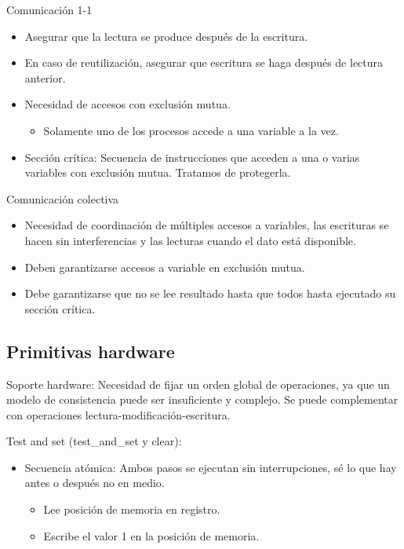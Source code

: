 \documentclass[12pt, twoside, openright]{report} %
\begin{document}
Comunicación 1-1

\begin{itemize}

	\item Asegurar que la lectura se produce después de la escritura.
	\item En caso de reutilización, asegurar que escritura se haga después
	      de lectura anterior.
	\item Necesidad de accesos con exclusión mutua.

	      \begin{itemize}

		      \item Solamente uno de los procesos accede a una variable a la vez.
	      \end{itemize}
	\item Sección crítica: Secuencia de instrucciones que acceden a una o
	      varias variables con exclusión mutua. Tratamos de protegerla.
\end{itemize}

Comunicación colectiva

\begin{itemize}

	\item Necesidad de coordinación de múltiples accesos a variables, las
	      escrituras se hacen sin interferencias y las lecturas cuando el
	      dato está disponible.
	\item Deben garantizarse accesos a variable en exclusión mutua.
	\item Debe garantizarse que no se lee resultado hasta que todos hasta
	      ejecutado su sección crítica.
\end{itemize}

\subsection{Primitivas hardware}



Soporte hardware: Necesidad de fijar un orden global de
operaciones, ya que un modelo de consistencia puede ser
insuficiente y complejo. Se puede complementar con operaciones
lectura-modificación-escritura.

Test and set (test\_and\_set y clear):

\begin{itemize}

	\item Secuencia atómica: Ambos pasos se ejecutan sin interrupciones,
	      sé lo que hay antes o después no en medio.

	      \begin{itemize}

		      \item Lee posición de memoria en registro.
		      \item Escribe el valor 1 en la posición de memoria.
	      \end{itemize}
\end{itemize}
\end{document}

